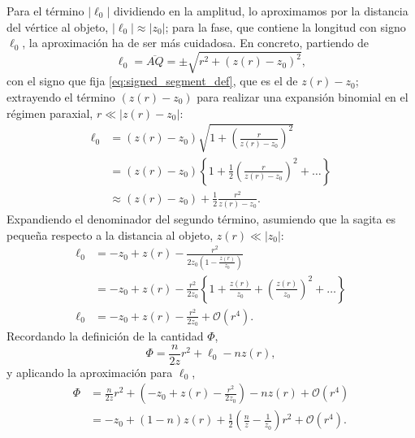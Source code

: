 Para el término $|\ell_0|$ dividiendo en la amplitud, lo aproximamos por la distancia del vértice al objeto, $|\ell_0|\approx|z_0|$; para la fase, que contiene la longitud con signo $\ell_0$, la aproximación ha de ser más cuidadosa. En concreto, partiendo de
\begin{equation}
    \ell_0
    =
    \overline{AQ}
    =
    \pm\sqrt{r^2 + (z(r) - z_0)^2},
\end{equation}
con el signo que fija \eqref{eq:signed_segment_def}, que es el de $z(r)-z_0$; extrayendo el término $(z(r) - z_0)$ para realizar una expansión binomial en el régimen paraxial, $r \ll |z(r)-z_0|$:
\begin{align}
    \ell_0
    &=
    (z(r) - z_0)
    \sqrt{
    1
    +
    \left(
    \frac{r}{z(r) - z_0}
    \right)^2
    }
    \nonumber
    \\
    &=
    (z(r) - z_0)
    \left\{
    1
    +
    \frac{1}{2}
    \left(
    \frac{r}{z(r) - z_0}
    \right)^2
    +
    \dots
    \right\}
    \nonumber
    \\
    &\approx
    (z(r) - z_0)
    +
    \frac{1}{2}
    \frac{r^2}{z(r) - z_0}.
\end{align}
Expandiendo el denominador del segundo término, asumiendo que la sagita es pequeña respecto a la distancia al objeto, $z(r)\ll |z_0|$:
\begin{align}
    \ell_0
    &=
    -z_0
    +
    z(r)
    -
    \frac{r^2}{2z_0\left(1-\frac{z(r)}{z_0}\right)}
    \nonumber
    \\
    &=
    -z_0
    +
    z(r)
    -
    \frac{r^2}{2z_0}
    \left\{
    1
    +
    \frac{z(r)}{z_0}
    +
    \left(\frac{z(r)}{z_0}\right)^2
    +
    \dots
    \right\}
    \nonumber
    \\
    \ell_0
    &=
    -z_0
    +
    z(r)
    -
    \frac{r^2}{2z_0}
    +
    \mathcal{O}(r^4).
\end{align}
Recordando la definición de la cantidad $\Phi$,
\begin{equation}
    \Phi
    =
    \frac{n}{2z}r^2
    +
    \ell_0
    -
    nz(r),
  \label{eq:phase_definition}
\end{equation}
y aplicando la aproximación para $\ell_0$,
\begin{align}
  \Phi
  &=
  \frac{n}{2z}r^2
  +
  \left(
  -z_0
  +
  z(r)
  -
  \frac{r^2}{2z_0}
  \right)
  -
  nz(r)
  +
  \mathscr O(r^4)
  \nonumber
  \\
  &=
  -z_0
  +
  (1-n)z(r)
  +
  \frac{1}{2}
  \left(
  \frac{n}{z}
  -
  \frac{1}{z_0}
  \right)r^2
  +
  \mathscr O(r^4).
\end{align}
